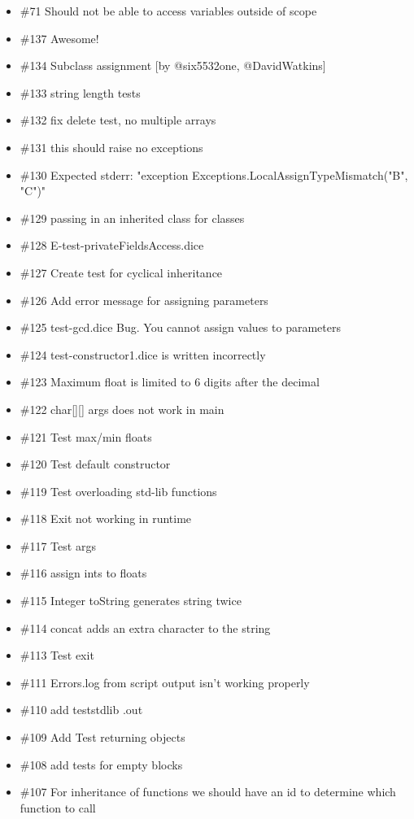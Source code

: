 \begin{homeworkProblem}
	\begin{itemize}
		\item \#71 Should not be able to access variables outside of scope
		\item \#137 Awesome!
		\item \#134 Subclass assignment [by @six5532one, @DavidWatkins]
		\item \#133 string length tests
		\item \#132 fix delete test, no multiple arrays
		\item \#131 this should raise no exceptions
		\item \#130 Expected stderr: "exception Exceptions.LocalAssignTypeMismatch("B", "C")"
		\item \#129 passing in an inherited class for classes
		\item \#128 E-test-privateFieldsAccess.dice
		\item \#127 Create test for cyclical inheritance
		\item \#126 Add error message for assigning parameters
		\item \#125 test-gcd.dice Bug. You cannot assign values to parameters
		\item \#124 test-constructor1.dice is written incorrectly
		\item \#123 Maximum float is limited to 6 digits after the decimal
		\item \#122 char[][] args does not work in main
		\item \#121 Test max/min floats
		\item \#120 Test default constructor
		\item \#119 Test overloading std-lib functions
		\item \#118 Exit not working in runtime
		\item \#117 Test args
		\item \#116 assign ints to floats
		\item \#115 Integer toString generates string twice
		\item \#114 concat adds an extra character to the string
		\item \#113 Test exit
		\item \#111 Errors.log from script output isn't working properly
		\item \#110 add teststdlib .out
		\item \#109 Add Test returning objects
		\item \#108 add tests for empty blocks
		\item \#107 For inheritance of functions we should have an id to determine which function to call

\end{itemize}
\end{homeworkProblem}
